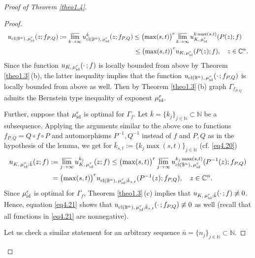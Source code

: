 \documentclass[11pt, oneside]{amsart}
\begin{document}
\begin{proof}[Proof of Theorem \ref{theo1.4}]
\begin{proof}
\begin{equation}
\begin{array}{r}
\displaystyle
u_{{\rm cl}(\mathbb B^n),\,\mu_{{\rm id}}^r}(z;f_{P,Q}):=\varlimsup_{k\rightarrow\infty}u^{k}_{{\rm cl}(\mathbb B^n),\,\mu_{{\rm id}}^r}(z; f_{P,Q}) \le \bigl(\max(s,t)\bigr)^r\varlimsup_{k\rightarrow\infty}u_{K,\,\mu_{{\rm id}}^r}^{k\max(s,t)}(P(z);f)\quad\medskip\\
\displaystyle \le \bigl(\max(s,t)\bigr)^r u_{K,\,\mu_{{\rm id}}^r} (P(z);f),\quad z\in\mathbb C^n.
\end{array}
\end{equation}
Since the function  $u_{K,\,\mu_{{\rm id}}^r}(\cdot\, ; f)$ is locally bounded from above by Theorem \ref{theo1.3}\,(b),  the latter inequality implies that the function $u_{{\rm cl}(\mathbb B^n),\,\mu_{{\rm id}}^r}(\cdot\, ;f_{P,Q})$ is locally bounded from above as well. Then by Theorem \ref{theo1.3}\,(b) graph $\Gamma_{f_{P,Q}}$ admits the Bernstein type inequality of exponent $\mu_{{\rm id}}^r$.

Further, suppose that $\mu_{{\rm id}}^r$ is optimal for $\Gamma_f$. Let $\bar k=\{k_j\}_{j\in\mathbb N}\subset\mathbb N$ be a subsequence. Applying the arguments similar to the above one to functions
$f_{P,Q}=Q\circ f\circ P$ and automorphisms $P^{-1}, Q^{-1}$ instead of $f$ and $P, Q$ as in the hypothesis of the lemma, we get  for $\bar{k}_{s,t}:=\{k_j \max(s,t)\}_{j\in\mathbb N}$ (cf. \eqref{eq4.20})
\begin{equation}\label{eq4.21}
\begin{array}{l}
\displaystyle
u_{K,\,\mu_{{\rm id}}^r;\bar k}(z;f):=\varlimsup_{j\rightarrow\infty}u^{k_j}_{K,\,\mu_{{\rm id}}^r}(z; f) \le \bigl(\max(s,t)\bigr)^r\varlimsup_{j\rightarrow\infty}u_{{\rm cl}(\mathbb B^n),\,\mu_{{\rm id}}^r}^{k_j\max(s,t)}(P^{-1}(z);f_{P,Q})\medskip\\
\displaystyle \qquad\qquad\qquad\ = \bigl(\max(s,t)\bigr)^r u_{{\rm cl}(\mathbb B^n),\,\mu_{{\rm id}}^r;\bar {k}_{s,t}} (P^{-1}(z);f_{P,Q}),\quad  z\in\mathbb C^n.
\end{array}
\end{equation}
Since $\mu_{{\rm id}}^r$ is optimal for $\Gamma_f$, Theorem \ref{theo1.3}\,(c) implies that $u_{K,\,\mu_{{\rm id}}^r;\bar k}(\cdot\,; f)\not\equiv 0$. Hence, equation \eqref{eq4.21} shows that $u_{{\rm cl}(\mathbb B^n),\,\mu_{{\rm id}}^r;\bar {k}_{s,t}} (\cdot\, ;f_{P,Q})\not\equiv 0$ as well (recall that all functions in \eqref{eq4.21} are nonnegative). 

Let us check a similar statement for an arbitrary sequence $\bar n=\{n_j\}_{j\in\mathbb N}\subset\mathbb N$. 


\end{proof}
\end{proof}
\end{document}
